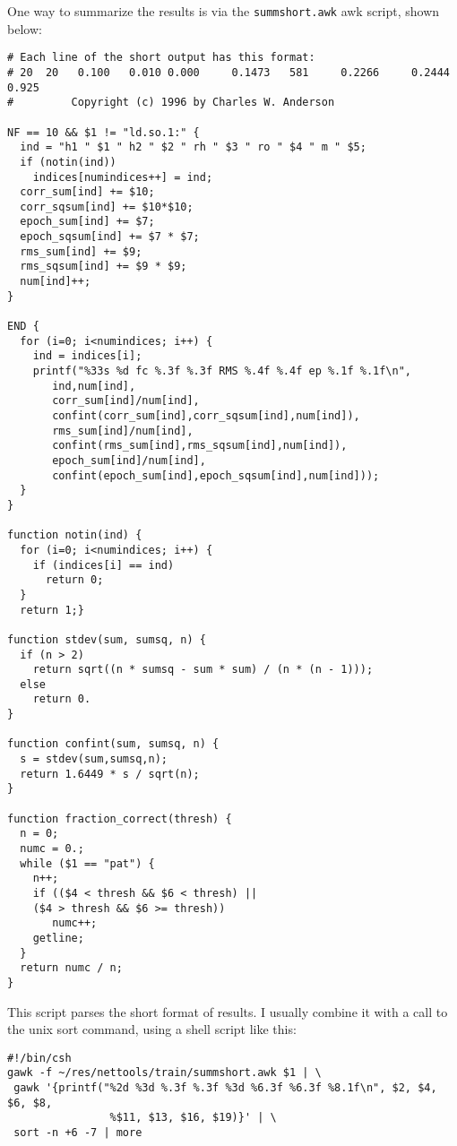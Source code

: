 One way to summarize the results is via the \verb'summshort.awk' awk script,
shown below:
\begin{small}
\begin{verbatim}
# Each line of the short output has this format:
# 20  20   0.100   0.010 0.000     0.1473   581     0.2266     0.2444 0.925
#         Copyright (c) 1996 by Charles W. Anderson

NF == 10 && $1 != "ld.so.1:" { 
  ind = "h1 " $1 " h2 " $2 " rh " $3 " ro " $4 " m " $5;
  if (notin(ind))
    indices[numindices++] = ind;
  corr_sum[ind] += $10;
  corr_sqsum[ind] += $10*$10;
  epoch_sum[ind] += $7;
  epoch_sqsum[ind] += $7 * $7;
  rms_sum[ind] += $9;
  rms_sqsum[ind] += $9 * $9;
  num[ind]++;
}

END {
  for (i=0; i<numindices; i++) {
    ind = indices[i];
    printf("%33s %d fc %.3f %.3f RMS %.4f %.4f ep %.1f %.1f\n",
	   ind,num[ind],
	   corr_sum[ind]/num[ind],
	   confint(corr_sum[ind],corr_sqsum[ind],num[ind]),
	   rms_sum[ind]/num[ind],
	   confint(rms_sum[ind],rms_sqsum[ind],num[ind]),
	   epoch_sum[ind]/num[ind], 
	   confint(epoch_sum[ind],epoch_sqsum[ind],num[ind]));
  }
}

function notin(ind) {
  for (i=0; i<numindices; i++) {
    if (indices[i] == ind)
      return 0;
  }
  return 1;}

function stdev(sum, sumsq, n) {
  if (n > 2)
    return sqrt((n * sumsq - sum * sum) / (n * (n - 1)));
  else
    return 0.
}

function confint(sum, sumsq, n) {
  s = stdev(sum,sumsq,n);
  return 1.6449 * s / sqrt(n);
}

function fraction_correct(thresh) {
  n = 0;
  numc = 0.;
  while ($1 == "pat") {
    n++;
    if (($4 < thresh && $6 < thresh) ||
	($4 > thresh && $6 >= thresh))      
       numc++;
    getline;
  }
  return numc / n;
}
\end{verbatim}
\end{small}
This script parses the short format of results.  I usually combine it with a
call to the unix sort command, using a shell script like this:
\begin{small}
\begin{verbatim}
#!/bin/csh
gawk -f ~/res/nettools/train/summshort.awk $1 | \
 gawk '{printf("%2d %3d %.3f %.3f %3d %6.3f %6.3f %8.1f\n", $2, $4, $6, $8,
                %$11, $13, $16, $19)}' | \
 sort -n +6 -7 | more
\end{verbatim}
\end{small}

